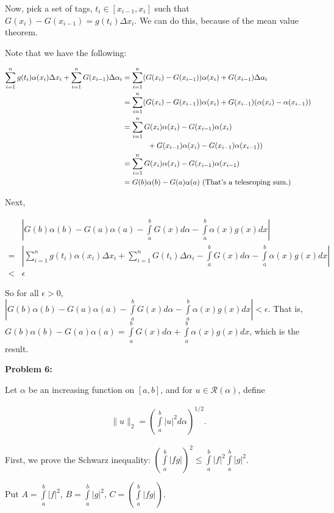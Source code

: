 \documentclass[a4paper,12pt]{article}
\newcommand{\tab}{\hspace{4mm}} %
\newcommand{\shunt}{\vspace{20mm}}
\newcommand{\absval}[1]{\left\lvert #1 \right\rvert}
\newcommand{\norm}[1]{\|#1\|}
\newcommand{\al}{\alpha} %
\newcommand{\De}{\Delta}
\newcommand{\ep}{\epsilon}
\newcommand{\scrR}{\mathcal{R}}
\begin{document}
Now, pick a set of tags, $t_i \in [x_{i-1},x_i]$ such that $G(x_i) - G(x_{i-1}) = g(t_i)\De x_i$. We can do this, because of the mean value theorem.

Note that we have the following:

\begin{align*}
\sum\limits_{i=1}^n g(t_i)\al(x_i) \Delta x_i + \sum\limits_{i=1}^n G(x_{i-1})\Delta \al_i &= \sum\limits_{i=1}^n (G(x_i)-G(x_{i-1})) \al(x_i) + G(x_{i-1}) \De \al_i \\
&= \sum\limits_{i=1}^n (G(x_i)-G(x_{i-1}))\al(x_i) + G(x_{i-1})(\al(x_i)-\al(x_{i-1})) \\
&= \sum\limits_{i=1}^n G(x_i)\al(x_i)-G(x_{i-1})\al(x_i) \\
& \tab \tab \tab + G(x_{i-1})\al(x_i)-G(x_{i-1})\al(x_{i-1})) \\
&= \sum\limits_{i=1}^n G(x_i)\al(x_i)-G(x_{i-1})\al(x_{i-1}) \\
&= G(b)\al(b) - G(a)\al(a) \text{ (That's a telescoping sum.)}
\end{align*}

Next,

\begin{align*}
&\absval{G(b)\al(b)-G(a)\al(a)- \int\limits_a^b G(x)d\al - \int\limits_a^b \al(x)g(x)dx} \\
=& \absval{\sum\limits_{i=1}^n g(t_i)\al(x_i) \Delta x_i + \sum\limits_{i=1}^n G(t_i)\Delta \al_i - \int\limits_a^b G(x)d\al - \int\limits_a^b \al(x)g(x)dx} \\
<& \ep
\end{align*}

So for all $\ep >0$, $\absval{G(b)\al(b)-G(a)\al(a)- \int\limits_a^b G(x)d\al - \int\limits_a^b \al(x)g(x)dx} < \ep$. That is, $G(b)\al(b)-G(a)\al(a) =  \int\limits_a^b G(x)d\al + \int\limits_a^b \al(x)g(x)dx$, which is the result.

\shunt

{\bf Problem 6:}

Let $\al$ be an increasing function on $[a,b]$, and for $u \in \scrR (\al)$, define

\begin{align*}
\norm{u}_2 = \left(\int\limits_a^b \absval{u}^2 d\al \right)^{1/2}.
\end{align*}

First, we prove the Schwarz inequality:  $\left(\int\limits_a^b \absval{fg} \right)^2 \leq \int\limits_a^b \absval{f}^2 \int\limits_a^b \absval{g}^2$.

\tab Put $A = \int\limits_a^b \absval{f}^2$, $B = \int\limits_a^b \absval{g}^2$, $C = \left(\int\limits_a^b \absval{fg} \right)$. 
\end{document}
